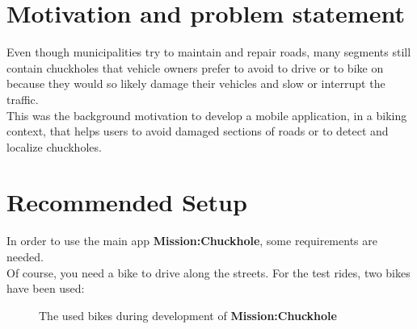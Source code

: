\documentclass[10pt,a4paper]{article} %
\begin{document}
    \pagestyle{plain}
    \title{\rmfamily\normalfont{}}
    \author{}
    \date{} %
    
    \maketitle
    

    \tableofcontents
    


    \section{Motivation and problem statement}

	

Even though municipalities try to maintain and repair roads, many segments still contain chuckholes that vehicle owners prefer to avoid to drive or to bike on because they would so likely damage their vehicles and slow or interrupt the traffic.\\
This was the background motivation to develop a mobile application, in a biking context, that helps users to avoid damaged sections of roads or to detect and localize chuckholes.

    \section{Recommended Setup}

	In order to use the main app \textbf{Mission:Chuckhole}, some requirements are needed.\\
	Of course, you need a bike to drive along the streets.
	For the test rides, two bikes have been used:

	\begin{figure}[H]
	  \centering
	  \hfill
	  \caption{The used bikes during development of \textbf{Mission:Chuckhole}}
	  \label{fig:onboarding}
	\end{figure}
\end{document}
